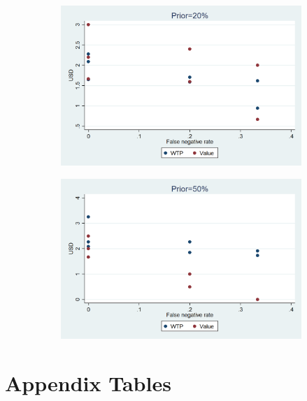 \documentclass[11pt,a4paper]{article}
\begin{document}
\begin{figure}[!h]
\begin{subfigure}[t]{0.5\textwidth}
  \centering
  \includegraphics[width=.95\linewidth]{Graphs/hist_WTP_FN_coll2.png}
\end{subfigure}%
\begin{subfigure}[t]{0.5\textwidth}
  \centering
  \includegraphics[width=.95\linewidth]{Graphs/hist_WTP_FN_coll5.png}

\end{subfigure}

\end{figure}
\fi


\newpage
\section{Appendix Tables}



 \label{wtp_dem}
\end{document}
